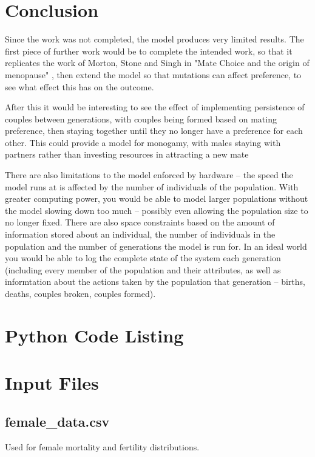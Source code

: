 \documentclass[authoryearcitations]{UoYCSproject}
\begin{document}
\chapter{Conclusion}
\label{cha:Conclusion}
Since the work was not completed, the model produces very limited results. The first piece of further work would be to complete the intended work, so that it replicates the work of Morton, Stone and Singh in "Mate Choice and the origin of menopause" \cite{mateChoice2013}, then extend the model so that mutations can affect preference, to see what effect this has on the outcome. 

After this it would be interesting to see the effect of implementing persistence of couples between generations, with couples being formed based on mating preference, then staying together until they no longer have a preference for each other. This could provide a model for monogamy, with males staying with partners rather than investing resources in attracting a new mate

There are also limitations to the model enforced by hardware -- the speed the model runs at is affected by the number of individuals of the population. With greater computing power, you would be able to model larger populations without the model slowing down too much -- possibly even allowing the population size to no longer fixed. There are also space constraints based on the amount of information stored about an individual, the number of individuals in the population and the number of generations the model is run for. In an ideal world you would be able to log the complete state of the system each generation (including every member of the population and their attributes, as well as informtation about the actions taken by the population that generation -- births, deaths, couples broken, couples formed).



 

\appendix
\chapter{Python Code Listing}

\chapter{Input Files}
\section{female\_data.csv}
Used for female mortality and fertility distributions.
\end{document}
